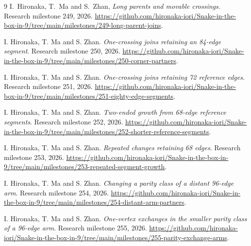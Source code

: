 \documentclass[11pt,a4paper]{article}
\begin{document}
\begin{thebibliography}{9}
I.~Hironaka, T.~Ma and S.~Zhan, \emph{Long parents and movable crossings}.
Research milestone 249, 2026.
\url{https://github.com/hironaka-iori/Snake-in-the-box-in-9/tree/main/milestones/249-long-parent-joins}.

I. Hironaka, T. Ma and S. Zhan.
\emph{One-crossing joins retaining an 84-edge segment}.
Research milestone 250, 2026.
\url{https://github.com/hironaka-iori/Snake-in-the-box-in-9/tree/main/milestones/250-corner-partners}.

I. Hironaka, T. Ma and S. Zhan.
\emph{One-crossing joins retaining 72 reference edges}.
Research milestone 251, 2026.
\url{https://github.com/hironaka-iori/Snake-in-the-box-in-9/tree/main/milestones/251-eighty-edge-segments}.

I. Hironaka, T. Ma and S. Zhan.
\emph{Two-ended growth from 68-edge reference segments}.
Research milestone 252, 2026.
\url{https://github.com/hironaka-iori/Snake-in-the-box-in-9/tree/main/milestones/252-shorter-reference-segments}.

I. Hironaka, T. Ma and S. Zhan.
\emph{Repeated changes retaining 68 edges}.
Research milestone 253, 2026.
\url{https://github.com/hironaka-iori/Snake-in-the-box-in-9/tree/main/milestones/253-repeated-segment-growth}.

I. Hironaka, T. Ma and S. Zhan.
\emph{Changing a parity class of a distant 96-edge arm}.
Research milestone 254, 2026.
\url{https://github.com/hironaka-iori/Snake-in-the-box-in-9/tree/main/milestones/254-distant-arm-partners}.

I. Hironaka, T. Ma and S. Zhan.
\emph{One-vertex exchanges in the smaller parity class of a 96-edge arm}.
Research milestone 255, 2026.
\url{https://github.com/hironaka-iori/Snake-in-the-box-in-9/tree/main/milestones/255-parity-exchange-arms}.

\end{thebibliography}
\end{document}
